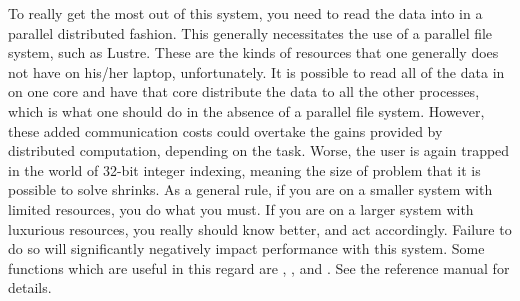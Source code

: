 To really get the most out of this system, you need to read the data into  in a parallel distributed fashion.  This generally necessitates the use of a parallel file system, such as Lustre.  These are the kinds of resources that one generally does not have on his/her laptop, unfortunately.  It is possible to read all of the data in on one core and have that core distribute the data to all the other processes, which is what one should do in the absence of a parallel file system.  However, these added communication costs could  overtake the gains provided by distributed computation, depending on the task.  Worse, the user is again trapped in the world of 32-bit integer indexing, meaning the size of problem that it is possible to solve shrinks.
\np
As a general rule, if you are on a smaller system with limited resources, you do what you must.  If you are on a larger system with luxurious resources, you really should know better, and act accordingly.  Failure to do so will significantly negatively impact performance with this system.
\np
Some functions which are useful in this regard are , , and .  See the reference manual for details.


